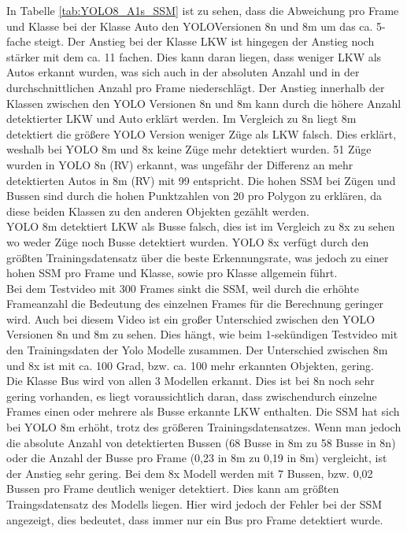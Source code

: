 {		In Tabelle \ref{tab:YOLO8_A1s_SSM} ist zu sehen, dass die Abweichung pro Frame und Klasse bei der Klasse Auto den YOLOVersionen 8n und 8m um das ca. 5-fache steigt. Der Anstieg bei der Klasse LKW ist hingegen der Anstieg noch stärker mit dem ca. 11 fachen. Dies kann daran liegen, dass weniger LKW als Autos erkannt wurden, was sich auch in der absoluten Anzahl und in der durchschnittlichen Anzahl pro Frame niederschlägt. Der Anstieg innerhalb der Klassen zwischen den YOLO Versionen 8n und 8m kann durch die höhere Anzahl detektierter LKW und Auto erklärt werden.
		Im Vergleich zu  8n liegt 8m detektiert die größere YOLO Version weniger Züge als LKW falsch. Dies erklärt, weshalb bei YOLO 8m und 8x keine Züge mehr detektiert wurden. 51 Züge wurden in YOLO 8n (RV) erkannt, was ungefähr der Differenz an mehr detektierten Autos in 8m (RV) mit 99 entspricht. Die hohen SSM bei Zügen und Bussen sind durch die hohen Punktzahlen von 20 pro Polygon zu erklären, da diese beiden Klassen zu den \glqq anderen Objekten\grqq{} gezählt werden. \\
		YOLO 8m detektiert LKW als Busse falsch, dies ist im Vergleich zu 8x zu sehen wo weder Züge noch Busse detektiert wurden. YOLO 8x verfügt durch den größten Trainingsdatensatz über die beste Erkennungsrate, was jedoch zu einer hohen SSM pro Frame und Klasse, sowie pro Klasse allgemein führt. \\
		Bei dem Testvideo mit 300 Frames sinkt die SSM, weil durch die erhöhte Frameanzahl die Bedeutung des einzelnen Frames für die Berechnung geringer wird. Auch bei diesem Video ist ein großer Unterschied zwischen den YOLO Versionen 8n und 8m zu sehen. Dies hängt, wie beim 1-sekündigen Testvideo mit den Trainingsdaten der Yolo Modelle zusammen. Der Unterschied zwischen 8m und 8x ist mit ca. 100 Grad, bzw. ca. 100 mehr erkannten Objekten, gering. \\
		Die Klasse Bus wird von allen 3 Modellen erkannt. Dies ist bei 8n noch sehr gering vorhanden, es liegt voraussichtlich daran, dass zwischendurch einzelne Frames einen oder mehrere als Busse erkannte LKW enthalten. Die SSM hat sich bei YOLO 8m erhöht, trotz des größeren Trainingsdatensatzes. Wenn man jedoch die absolute Anzahl von detektierten Bussen (68 Busse in 8m zu 58 Busse in 8n) oder die Anzahl der Busse pro Frame (0,23 in 8m zu 0,19 in 8m) vergleicht, ist der Anstieg sehr gering. Bei dem 8x Modell werden mit 7 Bussen, bzw. 0,02 Bussen pro Frame deutlich weniger detektiert. Dies kann am größten Traingsdatensatz des Modells liegen. Hier wird jedoch der Fehler bei der SSM angezeigt, dies bedeutet, dass immer nur ein Bus pro Frame detektiert wurde. 
}
